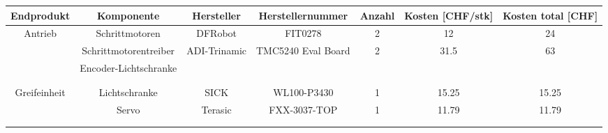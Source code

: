\documentclass[main.tex]{subfiles} %
\begin{document}
\begin{landscape}
\begin{table}[h]                                    %
    \centering
    \begin{tabular}{|c|c|c|c|c|c|c|}                        %
        \hline
        \textbf{Endprodukt} & \textbf{Komponente}        & \textbf{Hersteller}    & \textbf{Herstellernummer}          & \textbf{Anzahl}     & \textbf{Kosten [CHF/stk]}  & \textbf{Kosten total [CHF]}     \\ \hline
        Antrieb             & Schrittmotoren             & DFRobot                & FIT0278                            & 2                   & 12                         & 24                              \\ \hline
                            & Schrittmotorentreiber      & ADI-Trinamic           & TMC5240 Eval Board                 & 2                   & 31.5                       & 63                              \\ \hline
                            & Encoder-Lichtschranke      &                        &                                    &                     &                            &                                 \\ \hline
                            &                            &                        &                                    &                     &                            &                                 \\ \hline
                            &                            &                        &                                    &                     &                            &                                 \\ \hline
        Greifeinheit        & Lichtschranke              & SICK                   & WL100-P3430                        & 1                   & 15.25                      & 15.25                           \\ \hline
                            & Servo                      & Terasic                & FXX-3037-TOP                       & 1                   & 11.79                      & 11.79                           \\ \hline
                            &                            &                        &                                    &                     &                            &                                 \\ \hline
                            &                            &                        &                                    &                     &                            &                                 \\ \hline

\end{tabular}
\end{table}
\end{landscape}
\end{document}
